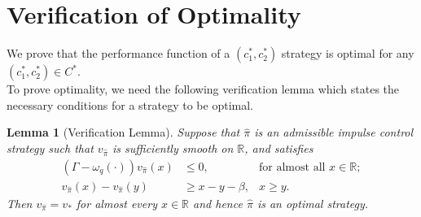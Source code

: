 \documentclass[11pt,reqno]{amsart}
\newtheorem{lemma}{Lemma}[section]
\newcommand{\reals}{\mathbb{R}}
\newcommand{\homega}{\omega_q}
\renewcommand{\leq}{\leqslant}
\renewcommand{\geq}{\geqslant}
\begin{document}
\section{Verification of Optimality}\label{Sec:Verification}
We prove that the performance function of a $(c_1^\ast,c_2^\ast)$ strategy is optimal for any $(c_1^\ast,c_2^\ast) \in C^\ast$.\\
To prove optimality, we need the following verification lemma which states the necessary conditions for a strategy to be optimal.
\begin{lemma}[Verification Lemma]
	Suppose that $\hat{\pi}$ is an admissible impulse control strategy such that $v_{\hat{\pi}}$ is sufficiently smooth on $\reals$, and satisfies
	\begin{align}
		(\Gamma - \homega(\cdot))v_{\hat{\pi}}(x) &\leq 0, &\text{for almost all } x \in \reals;\label{variational:1}\\
		v_{\hat{\pi}}(x) - v_{\hat{\pi}}(y ) & \geq x-y-\beta, & x\geq y.\label{variational:2}
	\end{align}
	Then $v_{\hat{\pi}} = v_{\ast}$ for almost every $x\in \reals$ and hence $\hat{\pi}$ is an optimal strategy.
\end{lemma}
\end{document}
